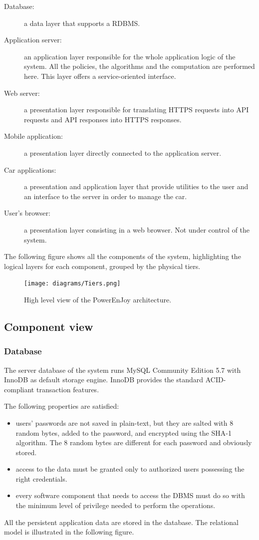 \begin{description}
	\item[Database:] a data layer that supports a RDBMS.
	\item[Application server:] an application layer responsible for the whole application logic of the system. All the policies, the algorithms and the computation are performed here. This layer offers a service-oriented interface.
	\item[Web server:] a presentation layer responsible for translating HTTPS requests into API requests and API responses into HTTPS responses. 
	\item[Mobile application:] a presentation layer directly connected to the application server.
	\item[Car applications:] a presentation and application layer that provide utilities to the user and an interface to the server in order to manage the car.
	\item[User's browser:] a presentation layer consisting in a web browser. Not under control of the system.
\end{description}
The following figure shows all the components of the system, highlighting the logical layers for each component, grouped by the physical tiers.

\begin{figure}[H]
	\centering
	\texttt{[image: diagrams/Tiers.png]}
	\caption{High level view of the PowerEnJoy architecture.}
	\label {fig:tiers}
\end{figure}

\subsection{Component view}

\subsubsection{Database}

The server database of the system runs MySQL Community Edition 5.7 with InnoDB as default storage engine. InnoDB provides the standard ACID-compliant transaction features.

The following properties are satisfied:
\begin{itemize}
	\item users' passwords are not saved in plain-text, but they are salted with 8 random bytes, added to the password, and encrypted using the SHA-1 algorithm. The 8 random bytes are different for each password and obviously stored.
	\item access to the data must be granted only to authorized users possessing the right credentials.
	\item every software component that needs to access the DBMS must do so with the minimum level of privilege needed to perform the operations.
\end{itemize}
All the persistent application data are stored in the database. The relational model is illustrated in the following figure.

